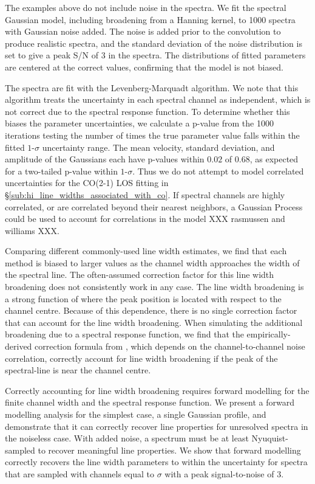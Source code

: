 \documentclass{rnaastex}
\begin{document}
The examples above do not include noise in the spectra. We fit the spectral Gaussian model, including broadening from a Hanning kernel, to 1000 spectra with Gaussian noise added.  The noise is added prior to the convolution to produce realistic spectra, and the standard deviation of the noise distribution is set to give a peak S/N of $3$ in the spectra.  The distributions of fitted parameters are centered at the correct values, confirming that the model is not biased.

The spectra are fit with the Levenberg-Marquadt algorithm.  We note that this algorithm treats the uncertainty in each spectral channel as independent, which is not correct due to the spectral response function.  To determine whether this biases the parameter uncertainties, we calculate a p-value from the 1000 iterations testing the number of times the true parameter value falls within the fitted $1\mbox{-}\sigma$ uncertainty range.  The mean velocity, standard deviation, and amplitude of the Gaussians each have p-values within $0.02$ of $0.68$, as expected for a two-tailed p-value within $1\mbox{-}\sigma$.  Thus we do not attempt to model correlated uncertainties for the CO(2-1) LOS fitting in \S\ref{sub:hi_line_widths_associated_with_co}. If spectral channels are highly correlated, or are correlated beyond their nearest neighbors, a Gaussian Process could be used to account for correlations in the model XXX rasmussen and williams XXX.

Comparing different commonly-used line width estimates, we find that each method is biased to larger values as the channel width approaches the width of the spectral line.  The often-assumed correction factor for this line width broadening does not consistently work in any case.  The line width broadening is a strong function of where the peak position is located with respect to the channel centre.  Because of this dependence, there is no single correction factor that can account for the line width broadening.  When simulating the additional broadening due to a spectral response function, we find that the empirically-derived correction formula from \citet{leroy16}, which depends on the channel-to-channel noise correlation, correctly account for line width broadening if the peak of the spectral-line is near the channel centre.

Correctly accounting for line width broadening requires forward modelling for the finite channel width and the spectral response function.  We present a forward modelling analysis for the simplest case, a single Gaussian profile, and demonstrate that it can correctly recover line properties for unresolved spectra in the noiseless case.  With added noise, a spectrum must be at least Nyuquist-sampled to recover meaningful line properties.  We show that forward modelling correctly recovers the line width parameters to within the uncertainty for spectra that are sampled with channels equal to $\sigma$ with a peak signal-to-noise of $3$.
\end{document}
